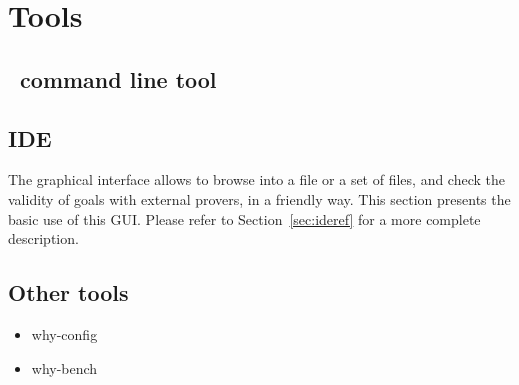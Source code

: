 \chapter{Tools}
\label{chap:tools}

\section{\why\ command line tool}

\section{IDE}

The graphical interface allows to browse into a file or a set of
files, and check the validity of goals with external provers, in a
friendly way. This section presents the basic use of this GUI. Please refer to Section~\ref{sec:ideref} for a more complete description.

\section{Other tools}

\begin{itemize}
\item why-config
\item why-bench
\end{itemize}



